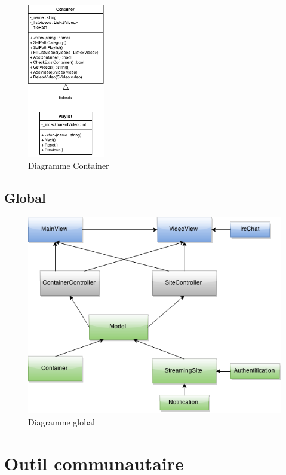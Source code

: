 \documentclass[11pt]{report} %
\begin{document}
			\begin{figure}[h]
				\center
				\includegraphics[width=0.3\textwidth]{../img/Container.png}
				\caption{Diagramme Container}
				\label{Container}
			\end{figure}
		
		
	\subsection{Global}
	
		\begin{figure}[h]
			\center
			\includegraphics[width=1\textwidth]{../img/Model.png}
			\caption{Diagramme global}
			\label{Global}
		\end{figure}
			
	\section{Outil communautaire}
\end{document}
